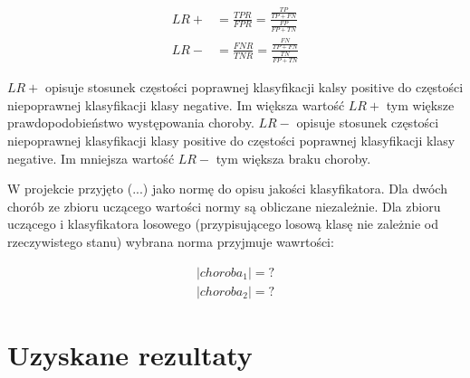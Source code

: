 \documentclass{article}
\begin{document}
\begin{equation}
\begin{aligned}
	LR+ &= \frac{TPR}{FPR} = \frac{\frac{TP}{TP+FN}}{\frac{FP}{FP+TN}} \\ 
	LR- &= \frac{FNR}{TNR} = \frac{\frac{FN}{TP+FN}}{\frac{TN}{FP+TN}}
\end{aligned}
\end{equation}

$LR+$ opisuje stosunek częstości poprawnej klasyfikacji kalsy positive do częstości niepoprawnej klasyfikacji klasy negative. Im większa wartość $LR+$ tym większe prawdopodobieństwo występowania choroby.
$LR-$ opisuje stosunek częstości niepoprawnej klasyfikacji klasy positive do częstości poprawnej klasyfikacji klasy negative. Im mniejsza wartość $LR-$ tym większa braku choroby.

W projekcie przyjęto (...) jako normę do opisu jakości klasyfikatora.
Dla dwóch chorób ze zbioru uczącego wartości normy są obliczane niezależnie.
Dla zbioru uczącego i klasyfikatora losowego (przypisującego losową klasę nie zależnie od rzeczywistego stanu) wybrana norma przyjmuje wawrtości:

\begin{equation}
\begin{aligned}
  |choroba_1| = ? \\
  |choroba_2| = ?
\end{aligned}
\end{equation}


\section{Uzyskane rezultaty}
\end{document}
